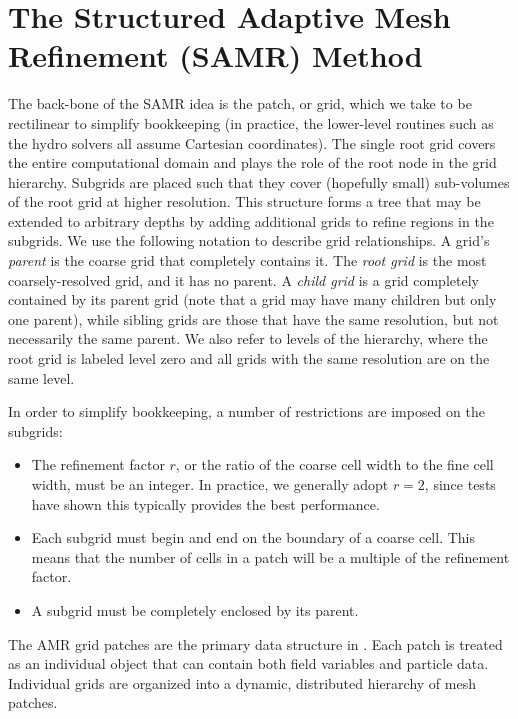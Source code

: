 \section{The Structured Adaptive Mesh Refinement (SAMR) Method}
\label{sec.amr}


The back-bone of the SAMR idea is the patch, or grid, which we take to
be rectilinear to simplify bookkeeping (in practice, the lower-level
routines such as the hydro solvers all assume Cartesian coordinates).
The single root grid covers the entire computational domain and plays
the role of the root node in the grid hierarchy.  Subgrids are placed
such that they cover (hopefully small) sub-volumes of the root grid at
higher resolution.  This structure forms a tree that may be extended
to arbitrary depths by adding additional grids to refine regions in
the subgrids.  We use the following notation to describe grid
relationships.  A grid's \textit{parent} is the coarse grid that
completely contains it.  The \textit{root grid} is the most
coarsely-resolved grid, and it has no parent.  A \textit{child grid}
is a grid completely contained by its parent grid (note that a grid
may have many children but only one parent), while sibling grids are
those that have the same resolution, but not necessarily the same
parent.  We also refer to levels of the hierarchy, where the root grid
is labeled level zero and all grids with the same resolution are on
the same level. 


In order to simplify bookkeeping, a number of restrictions are imposed
on the subgrids:

\begin{itemize}
 \item The refinement factor $r$, or the ratio of the coarse cell
   width to the fine cell width, must be an integer.  In practice, we
   generally adopt $r=2$, since tests have shown this typically
   provides the best performance.
 \item Each subgrid must begin and end on the boundary of a coarse
   cell.  This means that the number of cells in a patch will be a
   multiple of the refinement factor.
 \item A subgrid must be completely enclosed by its parent.
\end{itemize}

The AMR grid patches are the primary data structure in \enzo.  Each
patch is treated as an individual object that can contain both field
variables and particle data.  Individual grids are organized into a
dynamic, distributed hierarchy of mesh patches.  

